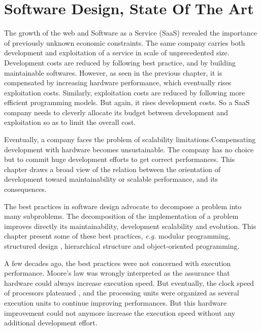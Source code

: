 \chapter{Software Design, State Of The Art} \label{chapter3}
\minitoc
\eject


The growth of the web and Software as a Service (SaaS) revealed the importance of previously unknown economic constraints.
The same company carries both development and exploitation of a service in scale of unprecedented size.
Development costs are reduced by following best practice, and by building maintainable softwares.
However, as seen in the previous chapter, it is compensated by increasing hardware performance, which eventually rises exploitation costs.
Similarly, exploitation costs are reduced by following more efficient programming models.
But again, it rises development costs.
So a SaaS company needs to cleverly allocate its budget between development and exploitation so as to limit the overall cost.

Eventually, a company faces the problem of scalability limitations.Compensating development with hardware becomes unsustainable.
The company has no choice but to commit huge development efforts to get correct performances.
This chapter draws a broad view of the relation between the orientation of development toward maintainability or scalable performance, and its consequences.

The best practices in software design advocate to decompose a problem into many subproblems.
The decomposition of the implementation of a problem improves directly its maintainability, development scalability and evolution.
This chapter present some of these best practices, \textit{e.g.} modular programming, structured design \cite{Stevens1974}, hierarchical structure \cite{Dijkstra1968} and object-oriented programming.

A few decades ago, the best practices were not concerned with execution performance.
Moore's law \cite{Moore1965} was wrongly interpreted as the assurance that hardware could always increase execution speed.
But eventually, the clock speed of processors plateaued \cite{Bohr2007}, and the processing units were organized as several execution units to continue improving performances.
But this hardware improvement could not anymore increase the execution speed without any additional development effort.

